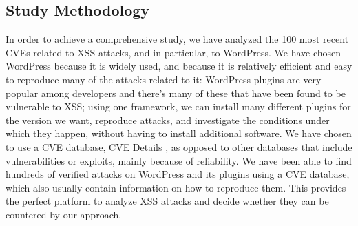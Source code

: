 \subsection{Study Methodology}
In order to achieve a comprehensive study, we have analyzed the 100 most recent CVEs related to \ac{XSS} attacks, and in particular, to WordPress. We have chosen WordPress because it is widely used, and because it is relatively efficient and easy to reproduce many of the attacks related to it: WordPress plugins are very popular among developers and there's many of these that have been found to be vulnerable to \ac{XSS}; using one framework, we can install many different plugins for the version we want, reproduce attacks, and investigate the conditions under which they happen, without having to install additional software. We have chosen to use a CVE database, CVE Details \cite{cvedetails}, as opposed to other databases that include vulnerabilities or exploits, mainly because of reliability. We have been able to find hundreds of verified attacks on WordPress and its plugins using a CVE database, which also usually contain information on how to reproduce them. This provides the perfect platform to analyze \ac{XSS} attacks and decide whether they can be countered by our approach. 

